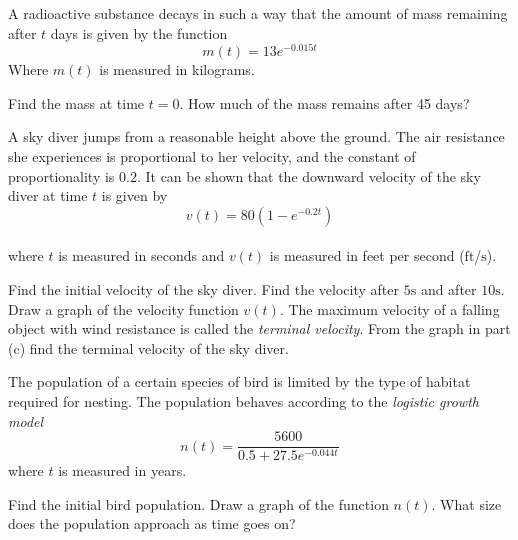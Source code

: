 \begin{Exercise}[title={Modelling},label=exModelling]
	\Question A radioactive substance decays in such a way that the amount of mass remaining after $t$ days is given by the function
	\begin{equation*}m (t) =13 e^{ -0.015 t}
	\end{equation*} Where $m (t)$ is measured in kilograms. 
	\begin{tasks}
		\task Find the mass at time $t =0$.%
		\task How much of the mass remains after 45 days?%
	\end{tasks}
	
	\Question A sky diver jumps from a reasonable height above the ground. The air resistance she experiences is proportional to her velocity, and the constant of proportionality is $0.2$. It can be shown that the downward velocity of the sky diver at time $t$ is given by
	\begin{equation*}v (t) =80 \left (1 -e^{ -0.2 t}\right )
	\end{equation*} \\\relax where $t$ is measured in seconds and $v (t)$ is measured in feet per second ($\mbox{ft}$/$\mbox{s}$).
	\begin{tasks}
		\task Find the initial velocity of the sky diver.%
		\task Find the velocity after $5 \mbox{s}$ and after $10 \mbox{s}$. %
		\task Draw a graph of the velocity function $v (t)\text{.}$%
		\task The maximum velocity of a falling object with wind resistance is called the \emph{terminal velocity}. From the graph in part (c) find the terminal velocity of the sky diver. %
	\end{tasks}

\Question The population of a certain species of bird is limited by the type of habitat required for nesting. The population behaves according to the \emph{logistic growth model}
\begin{equation*}n (t) =\frac{5600}{0.5 +27.5 e^{ -0.044 t}}
\end{equation*}  where $t$ is measured in years.
	\begin{tasks}
	\task Find the initial bird population. %
	\task Draw a graph of the function $n (t)$.%
	\task What size does the population approach as time goes on?%
\end{tasks}


\end{Exercise}
